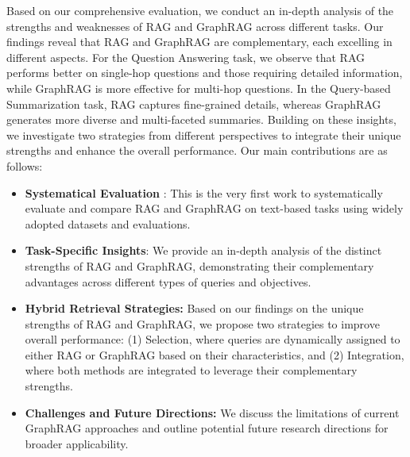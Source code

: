 Based on our comprehensive evaluation, we conduct an in-depth analysis of the strengths and weaknesses of RAG and GraphRAG across different tasks. Our findings reveal that RAG and GraphRAG are complementary, each excelling in different aspects. 
For the Question Answering task, we observe that RAG performs better on single-hop questions and those requiring detailed information, while GraphRAG is more effective for multi-hop questions. In the Query-based Summarization task, RAG captures fine-grained details, whereas GraphRAG generates more diverse and multi-faceted summaries. Building on these insights, we investigate two strategies from different perspectives to integrate their unique strengths and enhance the overall performance. Our main contributions are as follows:
\begin{itemize}[leftmargin=*, itemsep=1pt, parsep=0pt]
    \item \textbf{Systematical Evaluation }: This is the very first work to systematically evaluate and compare RAG and GraphRAG on text-based tasks using widely adopted datasets and evaluations. 
    \item \textbf{Task-Specific Insights}: We provide an in-depth analysis of the distinct strengths of RAG and GraphRAG, demonstrating their complementary advantages across different types of queries and objectives.
    \item \textbf{Hybrid Retrieval Strategies:} Based on our findings on the unique strengths of RAG and GraphRAG, we propose two strategies to improve overall performance: (1) Selection, where queries are dynamically assigned to either RAG or GraphRAG based on their characteristics, and (2) Integration, where both methods are integrated to leverage their complementary strengths.
    \item \textbf{Challenges and Future Directions:} We discuss the limitations of current GraphRAG approaches and outline potential future research directions for broader applicability.
\end{itemize}
